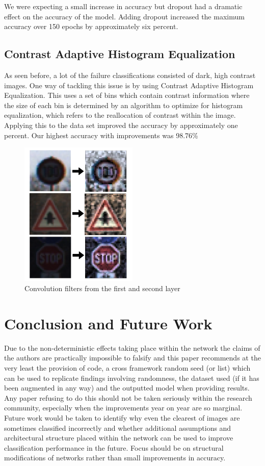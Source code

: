 \documentclass[conference]{IEEEtran}
\begin{document}
We were expecting a small increase in accuracy but dropout had a dramatic effect on the accuracy of the model. Adding dropout increased the maximum accuracy over 150 epochs by approximately six percent.

\subsection{Contrast Adaptive Histogram Equalization}
As seen before, a lot of the failure classifications consisted of dark, high contrast images. One way of tackling this issue is by using Contrast Adaptive Histogram Equalization. This uses a set of bins which contain contrast information where the size of each bin is determined by an algorithm to optimize for histogram equalization, which refers to the reallocation of contrast within the image. Applying this to the data set improved the accuracy by approximately one percent. Our highest accuracy with improvements was 98.76\%

\begin{figure}[ht]
    \centering
    \includegraphics[width=0.5\textwidth]{Histogram_Normalisation.png}
    \caption{Convolution filters from the first and second layer}
    \label{fig:adaptiveHistogram}
\end{figure}

\section{Conclusion and Future Work}

Due to the non-deterministic effects taking place within the network the claims of the authors are practically impossible to falsify and this paper recommends at the very least the provision of code, a cross framework random seed (or list) which can be used to replicate findings involving randomness, the dataset used (if it has been augmented in any way) and the outputted model when providing results. Any paper refusing to do this should not be taken seriously within the research community, especially when the improvements year on year are so marginal. Future work would be taken to identify why even the clearest of images are sometimes classified incorrectly and whether additional assumptions and architectural structure placed within the network can be used to improve classification performance in the future. Focus should be on structural modifications of networks rather than small improvements in accuracy.

\printbibliography
%
%
\end{document}
